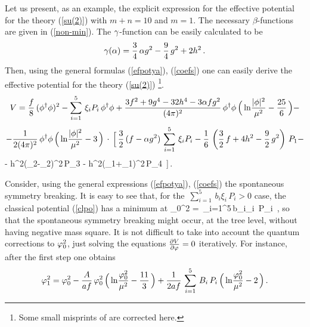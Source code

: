 Let us present, as an example, the explicit expression for the 
effective potential for the theory (\ref{su(2)}) with $m+n=10$
and $m=1$. The necessary 
$\beta$-functions are given in (\ref{non-min}). The $\gamma$-function
can be easily calculated to be 
$$
\gamma(\alpha)=\frac34\,\alpha g^2 -\frac94\,g^2 + 2h^2\,.
$$
Then, using the general formulas (\ref{efpotya}), (\ref{coefs})
one can easily derive the effective potential 
for the theory  (\ref{su(2)}) 
\footnote{Some small misprints of \cite{bosh-pot} are corrected 
here.}.
$$
V = \frac{f}{8}\,(\phi^{\dagger}\phi)^2 
- \sum_{i=1}^{5}\,\xi_iP_i\,\phi^{\dagger}\phi 
+ \frac{3f^2+9g^4-32h^4-3\alpha fg^2}{(4\pi)^2}\,\phi^{\dagger}\phi\,
\Big(\,{\rm ln}\frac{|\phi|^2}{\mu^2}-\frac{25}{6}\,\Big) -
$$
$$
- \frac{1}{2(4\pi)^2}\,\phi^{\dagger}\phi\,
\Big(\,{\rm ln}\frac{|\phi|^2}{\mu^2}-3\,\Big) \,\cdot\,
\Big[\,
\frac32\,(f-\alpha g^2)\,\sum_{i=1}^{5}\,\xi_iP_i - \frac16\,
\left(\frac32\,f+ 4h^2-\frac92\,g^2\right)\,P_1 -
$$
\beq
- h^2(\de_2-\eta_2)^2\,P_3 - h^2(\de_1+\eta_1)^2\,P_4
\,\Big]\,.
\label{efposu2}
\eeq
\vskip 3mm

Consider, using the general expressions (\ref{efpotya}), 
(\ref{coefs}) the spontaneous symmetry breaking. It is easy to see 
that, for the $\,\sum_{i=1}^{5}\,b_i\xi_i\, P_i > 0$ case, the
classical potential (\ref{clpo}) has a minimum at 
\beq
\ph_0^2 = \,\sum_{i=1}^{5}\,b_i\xi_i\, P_i \,,
\label{ssb}
\eeq
so that the spontaneous symmetry breaking might 
occur, at the tree level, without having negative 
mass square. It is not difficult to take into 
account the quantum corrections to $\varphi_0^2$, just solving 
the equations $\frac{\partial V}{\partial \varphi}=0$ iteratively. For 
instance, after the first step one obtains
$$ %
\ph_1^2= \ph_0^2 
- \frac{A}{af}\,\ph^2_0\,\Big(\,{\rm ln}\frac{\ph_0^2}{\mu^2}
-\frac{11}{3}\,\Big) + \frac{1}{2af}\,
\sum_{i=1}^{5}\,B_i\, P_i\,\Big(\,{\rm ln}\frac{\ph_0^2}{\mu^2}
- 2\,\Big) \,.
$$ %

